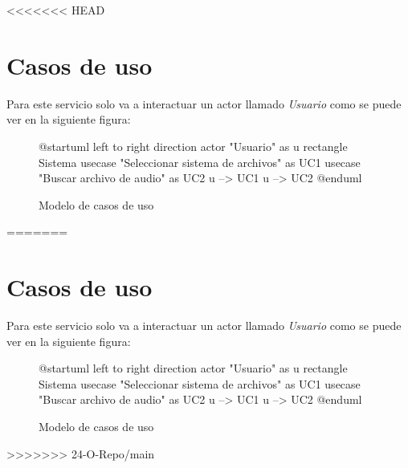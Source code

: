<<<<<<< HEAD

\section*{Casos de uso}

\noindent Para este servicio solo va a interactuar un actor llamado \emph{Usuario} como se puede ver
en la siguiente figura:

\begin{figure}[h]
	\centering
	\begin{plantuml}
		@startuml
		left to right direction
		actor "Usuario" as u
		rectangle Sistema {
			usecase "Seleccionar sistema de archivos" as UC1
			usecase "Buscar archivo de audio" as UC2
		}
		u --> UC1
		u --> UC2
		@enduml
	\end{plantuml}
	\caption{Modelo de casos de uso}
\end{figure}

=======

\section*{Casos de uso}

\noindent Para este servicio solo va a interactuar un actor llamado \emph{Usuario} como se puede ver
en la siguiente figura:

\begin{figure}[h]
	\centering
	\begin{plantuml}
		@startuml
		left to right direction
		actor "Usuario" as u
		rectangle Sistema {
			usecase "Seleccionar sistema de archivos" as UC1
			usecase "Buscar archivo de audio" as UC2
		}
		u --> UC1
		u --> UC2
		@enduml
	\end{plantuml}
	\caption{Modelo de casos de uso}
\end{figure}

>>>>>>> 24-O-Repo/main
